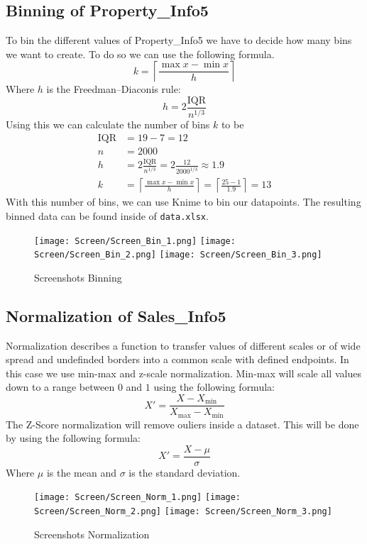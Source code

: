 \subsection{Binning of Property\_Info5}	
To bin the different values of Property\_Info5 we have to decide how many bins we want to create. To do so we can use the following formula.
\begin{equation*}
k = \left \lceil \frac{\max x - \min x}{h} \right \rceil
\end{equation*}
Where $h$ is the Freedman–Diaconis rule:
\begin{equation*}
h=2\frac{\text{IQR}}{n^{1/3}}
\end{equation*}
Using this we can calculate the number of bins $k$ to be
\begin{align*}
\text{IQR} &= 19-7 = 12\\
n &= 2000\\
h&=2\frac{\text{IQR}}{n^{1/3}} = 2\frac{12}{2000^{1/3}} \approx 1.9\\
k&=\left \lceil \frac{\max x - \min x}{h} \right \rceil = \left \lceil \frac{25 - 1}{1.9} \right \rceil = 13
\end{align*}
With this number of bins, we can use Knime to bin our datapoints. The resulting binned data can be found inside of \texttt{data.xlsx}.
\begin{figure}[H]
	\begin{center}
		\texttt{[image: Screen/Screen\_Bin\_1.png]}
		\texttt{[image: Screen/Screen\_Bin\_2.png]}
		\texttt{[image: Screen/Screen\_Bin\_3.png]}
	\end{center}
	\caption{Screenshots Binning}
\end{figure}
\subsection{Normalization of Sales\_Info5}
Normalization describes a function to transfer values of different scales or of wide spread and undefinded borders into a common scale with defined endpoints. In this case we use min-max and z-scale normalization. Min-max will scale all values down to a range between $0$ and $1$ using the following formula:
\begin{equation*}
X'={\frac {X-X_{\min }}{X_{\max }-X_{\min }}}
\end{equation*}
The Z-Score normalization will remove ouliers inside a dataset. This will be done by using the following formula: 
\begin{equation*}
X'=\frac{X - \mu}{\sigma}
\end{equation*}
Where $\mu$ is the mean and $\sigma$ is the standard deviation.
\begin{figure}[H]
	\begin{center}
		\texttt{[image: Screen/Screen\_Norm\_1.png]}
		\texttt{[image: Screen/Screen\_Norm\_2.png]}
		\texttt{[image: Screen/Screen\_Norm\_3.png]}
	\end{center}
	\caption{Screenshots Normalization}
\end{figure}

